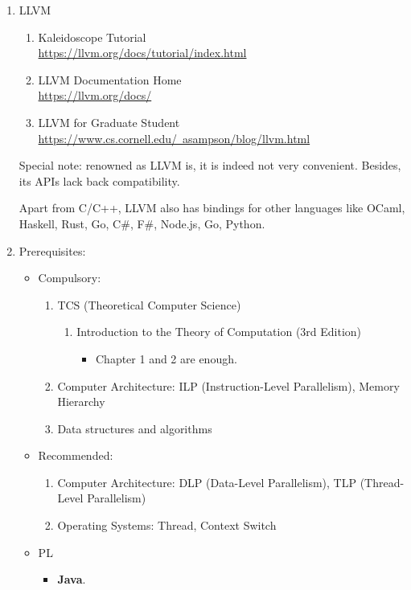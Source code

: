 \documentclass{article}
\begin{document}
\begin{enumerate}
    \item LLVM
    \begin{enumerate}
        \item Kaleidoscope Tutorial\\
        \href{https://llvm.org/docs/tutorial/index.html}{https://llvm.org/docs/tutorial/index.html}
        \item LLVM Documentation Home\\
        \href{https://llvm.org/docs/}{https://llvm.org/docs/}
        \item LLVM for Graduate Student\\
        \href{https://www.cs.cornell.edu/~asampson/blog/llvm.html}{https://www.cs.cornell.edu/~asampson/blog/llvm.html}
    \end{enumerate}    
    Special note: renowned as LLVM is, it is indeed not very convenient. Besides, its APIs lack back compatibility.

    Apart from C/C++, LLVM also has bindings for other languages like OCaml, Haskell, Rust, Go, C\#, F\#, Node.js, Go, Python.

    \item Prerequisites:
    \begin{itemize}
        \item Compulsory:
        \begin{enumerate}
        \item TCS (Theoretical Computer Science)
        \begin{enumerate}
            \item Introduction to the Theory of Computation (3rd Edition) \cite{sipser1996introduction}
            \begin{itemize}
                \item Chapter 1 and 2 are enough.
            \end{itemize}
        \end{enumerate}
        \item Computer Architecture: ILP (Instruction-Level Parallelism), Memory Hierarchy
        \item Data structures and algorithms
    \end{enumerate}
        \item Recommended:
        \begin{enumerate}
            \item Computer Architecture: DLP (Data-Level Parallelism), TLP (Thread-Level Parallelism)
            \item Operating Systems: Thread, Context Switch
        \end{enumerate}
        \item PL
        \begin{itemize}
            \item \textbf{Java}.
        \end{itemize}
    \end{itemize}
\end{enumerate}
\end{document}
